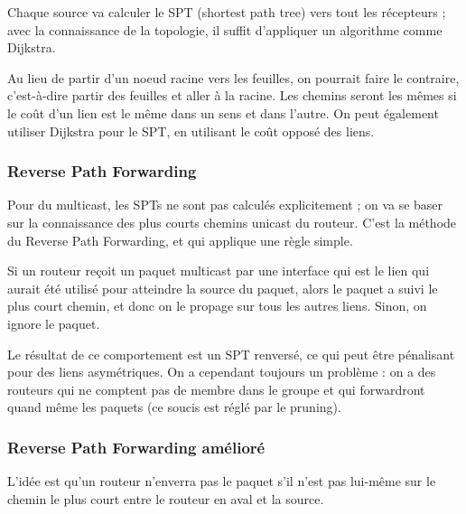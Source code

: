 		Chaque source va calculer le SPT (shortest path tree) vers tout les récepteurs ; avec la connaissance de la topologie, il suffit d'appliquer un algorithme comme Dijkstra.
		
		Au lieu de partir d'un noeud racine vers les feuilles, on pourrait faire le contraire, c'est-à-dire partir des feuilles et aller à la racine. Les chemins seront les mêmes si le coût d'un lien est le même dans un sens et dans l'autre. On peut également utiliser Dijkstra pour le SPT, en utilisant le coût opposé des liens.
		
		
			\subsubsection{Reverse Path Forwarding}
			
			Pour du multicast, les SPTs ne sont pas calculés explicitement ; on va se baser sur la connaissance des plus courts chemins unicast du routeur. C'est la méthode du Reverse Path Forwarding, et qui applique une règle simple.
			
		
			Si un routeur reçoit un paquet multicast par une interface qui est le lien qui aurait été utilisé pour atteindre la source du paquet, alors le paquet a suivi le plus court chemin, et donc on le propage sur tous les autres liens. Sinon, on ignore le paquet.
			
			
			Le résultat de ce comportement est un SPT renversé, ce qui peut être pénalisant pour des liens asymétriques. On a cependant toujours un problème : on a des routeurs qui ne comptent pas de membre dans le groupe et qui forwardront quand même les paquets (ce soucis est réglé par le pruning).
			
			\subsubsection{Reverse Path Forwarding amélioré}
			
			
			L'idée est qu'un routeur n'enverra pas le paquet s'il n'est pas lui-même sur le chemin le plus court entre le routeur en aval et la source.
		
